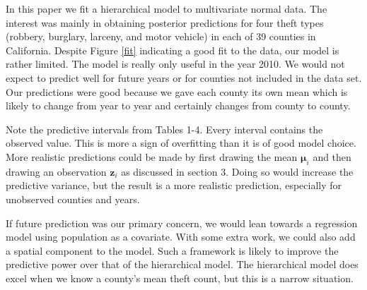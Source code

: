 \documentclass{asaproc}
\newcommand{\m}[1]{\mathbf{\bm{#1}}}
\begin{document}
In this paper we fit a hierarchical model to multivariate normal data. The interest was mainly in obtaining posterior predictions for four theft types (robbery, burglary, larceny, and motor vehicle) in each of 39 counties in California. Despite Figure \ref{fit} indicating a good fit to the data, our model is rather limited. The model is really only useful in the year 2010. We would not expect to predict well for future years or for counties not included in the data set. Our predictions were good because we gave each county its own mean which is likely to change from year to year and certainly changes from county to county.

Note the predictive intervals from Tables 1-4. Every interval contains the observed value. This is more a sign of overfitting than it is of good model choice. More realistic predictions could be made by first drawing the mean $\m{\mu}_i$ and then drawing an observation $\m{z}_i$ as discussed in section 3. Doing so would increase the predictive variance, but the result is a more realistic prediction, especially for unobserved counties and years.

If future prediction was our primary concern, we would lean towards a regression model using population as a covariate. With some extra work, we could also add a spatial component to the model. Such a framework is likely to improve the predictive power over that of the hierarchical model. The hierarchical model does excel when we know a county's mean theft count, but this is a narrow situation.
\end{document}
